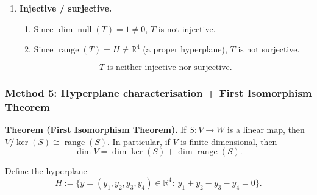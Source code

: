\documentclass[12pt]{article}
\begin{document}
\begin{enumerate}[label=(\alph*)]
\item \textbf{Injective / surjective.}
\begin{enumerate}[label=(\roman*)]
\item Since $\dim\operatorname{null}(T)=1\neq 0$, $T$ is not injective.
\item Since $\operatorname{range}(T)=H\ne \mathbb{R}^4$ (a proper hyperplane), $T$ is not surjective.
\end{enumerate}
\[
\boxed{\,T\text{ is neither injective nor surjective.}\,}
\]
\end{enumerate}
\newpage
\subsubsection{Method 5: Hyperplane characterisation + First Isomorphism Theorem}
\textbf{Theorem (First Isomorphism Theorem).} If $S:V\to W$ is a linear map, then $V/\ker(S)\cong \operatorname{range}(S)$.
In particular, if $V$ is finite-dimensional, then
\[
\dim V=\dim\ker(S)+\dim\operatorname{range}(S).
\]

Define the hyperplane
\[
H:=\{y=(y_1,y_2,y_3,y_4)\in\mathbb{R}^4:\ y_1+y_2-y_3-y_4=0\}.
\]
\end{document}
